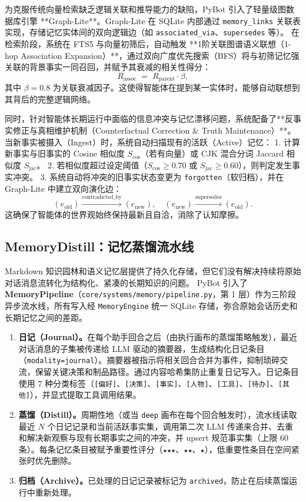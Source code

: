 \documentclass[11pt,a4paper]{article}
\begin{document}
为克服传统向量检索缺乏逻辑关联和推导能力的缺陷，PyBot 引入了轻量级图数据库引擎 **Graph-Lite**。Graph-Lite 在 SQLite 内部通过 \texttt{memory\_links} 关联表实现，存储记忆实体间的双向逻辑边（如 \texttt{associated\_via}、\texttt{supersedes} 等）。
在检索阶段，系统在 FTS5 与向量初筛后，自动触发 **1阶关联图谱语义联想（1-hop Association Expansion）**，通过双向广度优先搜索（BFS）将与初筛记忆强关联的背景事实一同召回，并赋予其衰减的相关性得分：
\begin{equation}
  R_{\text{assoc}} \;=\; R_{\text{parent}} \cdot \beta,
\end{equation}
其中 $\beta = 0.8$ 为关联衰减因子。这使得智能体在提到某一实体时，能够自动联想到其背后的完整逻辑网络。

同时，针对智能体长期运行中面临的信息冲突与记忆漂移问题，系统配备了**反事实修正与真相维护机制（Counterfactual Correction \& Truth Maintenance）**。当新事实被摄入（Ingest）时，系统自动扫描现有的活跃（Active）记忆：
1. 计算新事实与旧事实的 Cosine 相似度 $S_{\text{cos}}$（若有向量）或 CJK 混合分词 Jaccard 相似度 $S_{\text{jac}}$。
2. 若相似度超过设定阈值（$S_{\text{cos}} \ge 0.70$ 或 $S_{\text{jac}} \ge 0.60$），则判定发生事实冲突。
3. 系统自动将冲突的旧事实状态变更为 \texttt{forgotten}（软归档），并在 Graph-Lite 中建立双向演化边：
   \[
     (e_{\text{old}}) \xrightarrow{\text{contradicted\_by}} (e_{\text{new}}),\quad (e_{\text{new}}) \xrightarrow{\text{supersedes}} (e_{\text{old}}).
   \]
这确保了智能体的世界观始终保持最新且自洽，消除了认知摩擦。

\subsection{MemoryDistill：记忆蒸馏流水线}
\label{sec:deep-digest}

Markdown 知识园林和语义记忆层提供了持久化存储，但它们没有解决持续将原始对话消息流转化为结构化、紧凑的长期知识的问题。
PyBot 引入了 \textbf{MemoryPipeline}（\texttt{core/systems/memory/pipeline.py}，第 1 层）作为三阶段异步流水线，所有写入经 \texttt{MemoryEngine} 统一 SQLite 存储，弥合原始会话历史和长期记忆之间的差距。

\begin{enumerate}[label=\textbf{阶段~\arabic*.}]
  \item \textbf{日记（Journal）。}在每个助手回合之后（由执行画布的蒸馏策略触发），最近对话消息的子集被传递给 LLM 驱动的摘要器，生成结构化日记条目（\texttt{modality=journal}）。摘要器被指示将相关回合合并为事件，抑制琐碎交流，保留关键决策和制品路径。通过内容哈希集防止重复日记写入。日记条目使用 7 种分类标签（\texttt{[偏好]}、\texttt{[决策]}、\texttt{[事实]}、\texttt{[人物]}、\texttt{[工具]}、\texttt{[待办]}、\texttt{[其他]}），并显式提取工具调用结果。
  \item \textbf{蒸馏（Distill）。}周期性地（或当 \texttt{deep} 画布在每个回合触发时），流水线读取最近 $N$ 个日记记录和当前活跃事实集，调用第二次 LLM 传递来合并、去重和解决新观察与现有长期事实之间的冲突，并 upsert 规范事实集（上限 60 条）。每条记忆条目被赋予重要性评分（\texttt{★★★}、\texttt{★★}、\texttt{★}），低重要性条目在空间紧张时优先删除。
  \item \textbf{归档（Archive）。}已处理的日记记录被标记为 \texttt{archived}，防止在后续蒸馏运行中重新处理。
\end{enumerate}
\end{document}
